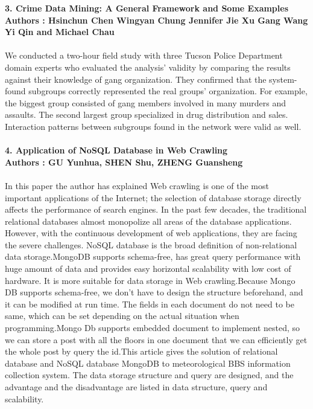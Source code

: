 \documentclass[12pt]{extreport}
\begin{document}
\textbf{3. Crime Data Mining: A General Framework and Some Examples}\\
\textbf{Authors : Hsinchun Chen Wingyan Chung Jennifer Jie Xu Gang Wang Yi Qin and Michael Chau}\\\\
We conducted a two-hour field study with three Tucson Police Department domain experts who evaluated the analysis' validity by comparing the results against their knowledge of gang organization. They confirmed that the system-found subgroups correctly represented the real groups' organization. For example, the biggest group consisted of gang members involved in many murders and assaults. The second largest group specialized in drug distribution and sales. Interaction patterns between subgroups found in the network were valid as well.\\\\
\textbf{4. Application of NoSQL Database in Web Crawling}\\
\textbf{Authors : GU Yunhua, SHEN Shu, ZHENG Guansheng}\\\\
In this paper the author has explained Web crawling is one of the most important applications of the Internet; the selection of database storage directly affects the performance of search engines. In the past few decades, the traditional relational databases almost monopolize all areas of the database applications. However, with the continuous development of web applications, they are facing the severe challenges. NoSQL database is the broad definition of non-relational data storage.MongoDB supports schema-free, has great query performance with huge amount of data and provides easy horizontal scalability with low cost of hardware. It is more suitable for data storage in Web crawling.Because Mongo DB supports schema-free, we don’t have to design the structure beforehand, and it can be modified at run time. The fields in each document do not need to be same, which can be set depending
on the actual situation when programming.Mongo Db supports embedded document to implement nested, so we can store a post with all the floors in one document that we can efficiently get the whole post by query the id.This article gives the solution of relational
database and NoSQL database MongoDB to meteorological BBS information collection system. The data storage structure and query are designed, and the advantage and the disadvantage are listed in data
structure, query and scalability.\\\\
\end{document}
